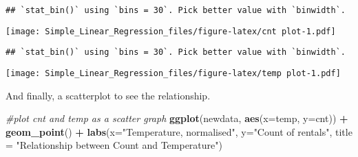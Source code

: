 \documentclass[]{article}
\newenvironment{Shaded}{\begin{snugshade}}{\end{snugshade}}
\newcommand{\KeywordTok}[1]{\textcolor[rgb]{0.13,0.29,0.53}{\textbf{#1}}}
\newcommand{\DataTypeTok}[1]{\textcolor[rgb]{0.13,0.29,0.53}{#1}}
\newcommand{\StringTok}[1]{\textcolor[rgb]{0.31,0.60,0.02}{#1}}
\newcommand{\CommentTok}[1]{\textcolor[rgb]{0.56,0.35,0.01}{\textit{#1}}}
\newcommand{\OperatorTok}[1]{\textcolor[rgb]{0.81,0.36,0.00}{\textbf{#1}}}
\newcommand{\NormalTok}[1]{#1}
\begin{document}
\begin{verbatim}
## `stat_bin()` using `bins = 30`. Pick better value with `binwidth`.
\end{verbatim}

\texttt{[image: Simple\_Linear\_Regression\_files/figure-latex/cnt plot-1.pdf]}

\begin{Shaded}
\end{Shaded}

\begin{verbatim}
## `stat_bin()` using `bins = 30`. Pick better value with `binwidth`.
\end{verbatim}

\texttt{[image: Simple\_Linear\_Regression\_files/figure-latex/temp plot-1.pdf]}

And finally, a scatterplot to see the relationship.

\begin{Shaded}
\begin{Highlighting}[]
\CommentTok{#plot cnt and temp as a scatter graph}
\KeywordTok{ggplot}\NormalTok{(newdata, }\KeywordTok{aes}\NormalTok{(}\DataTypeTok{x=}\NormalTok{temp, }\DataTypeTok{y=}\NormalTok{cnt)) }\OperatorTok{+}\StringTok{ }
\StringTok{  }\KeywordTok{geom_point}\NormalTok{() }\OperatorTok{+}\StringTok{ }
\StringTok{  }\KeywordTok{labs}\NormalTok{(}\DataTypeTok{x=}\StringTok{"Temperature, normalised"}\NormalTok{, }\DataTypeTok{y=}\StringTok{"Count of rentals"}\NormalTok{, }\DataTypeTok{title =} \StringTok{"Relationship between Count and Temperature"}\NormalTok{)}
\end{Highlighting}
\end{Shaded}
\end{document}
